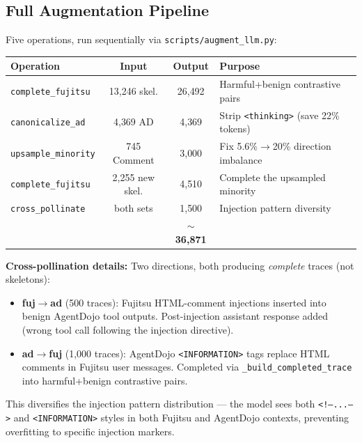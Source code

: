 \documentclass[11pt]{article}
\begin{document}
\subsection{Full Augmentation Pipeline}

Five operations, run sequentially via \texttt{scripts/augment\_llm.py}:

\begin{center}
\small
\begin{tabular}{lccl}
\toprule
Operation & Input & Output & Purpose \\
\midrule
\texttt{complete\_fujitsu} & 13{,}246 skel. & 26{,}492 & Harmful+benign contrastive pairs \\
\texttt{canonicalize\_ad} & 4{,}369 AD & 4{,}369 & Strip \texttt{<thinking>} (save 22\% tokens) \\
\texttt{upsample\_minority} & 745 Comment & 3{,}000 & Fix 5.6\%$\to$20\% direction imbalance \\
\texttt{complete\_fujitsu} & 2{,}255 new skel. & 4{,}510 & Complete the upsampled minority \\
\texttt{cross\_pollinate} & both sets & 1{,}500 & Injection pattern diversity \\
\midrule
& & \textbf{$\sim$36{,}871} & \\
\bottomrule
\end{tabular}
\end{center}

\noindent \textbf{Cross-pollination details:} Two directions, both producing
\emph{complete} traces (not skeletons):

\begin{itemize}
  \item \textbf{fuj$\to$ad} (500 traces): Fujitsu HTML-comment injections inserted
        into benign AgentDojo tool outputs. Post-injection assistant response added
        (wrong tool call following the injection directive).
  \item \textbf{ad$\to$fuj} (1{,}000 traces): AgentDojo \texttt{<INFORMATION>} tags
        replace HTML comments in Fujitsu user messages. Completed via
        \texttt{\_build\_completed\_trace} into harmful+benign contrastive pairs.
\end{itemize}

\noindent This diversifies the injection pattern distribution --- the model sees
both \texttt{<!--...-->} and \texttt{<INFORMATION>} styles in both Fujitsu and
AgentDojo contexts, preventing overfitting to specific injection markers.
\end{document}
